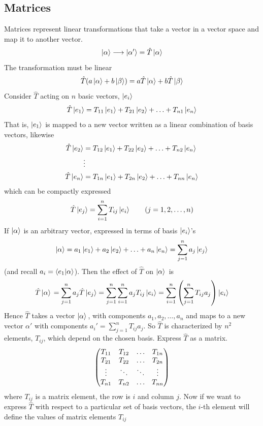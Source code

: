\documentclass[english, 11pt]{article}
\begin{document}
     \subsection{Matrices}

        Matrices represent linear transformations that take a vector in a vector space and map it to another vector.
        \[ \left|\alpha\right\rangle \longrightarrow \left|\alpha'\right\rangle= \hat{T} \left|\alpha\right\rangle \]
        The transformation must be linear
        \[ \hat{T}(a \left|\alpha\right\rangle + b \left|\beta\right\rangle) = a\hat{T}\left|\alpha\right\rangle + b \hat{T}\left|\beta\right\rangle \]
        Consider $\hat{T}$ acting on $n$ basic vectors, $\left|e_i\right\rangle$
        \[ \hat{T} \left|e_1\right\rangle = T_{11}\left|e_1\right\rangle + T_{21}\left|e_2\right\rangle + \ldots + T_{n1} \left|e_n\right\rangle \]
        That is, $\left|e_1\right\rangle$ is mapped to a new vector written as a linear combination of basis vectors, likewise
        \begin{align*}
          \hat{T} \left|e_2\right\rangle & = T_{12}\left|e_1\right\rangle + T_{22}\left|e_2\right\rangle + \ldots + T_{n2} \left|e_n\right\rangle \\
          & \vdots \\
          \hat{T} \left|e_n\right\rangle & = T_{1n} \left|e_1\right\rangle + T_{2n} \left|e_2\right\rangle + \ldots + T_{nn} \left|e_n\right\rangle
        \end{align*}
        which can be compactly expressed
        \[ \hat{T}\ket{e_j} = \sum_{i=1}^nT_{ij} \ket{e_i} \ \ \ \ \ \ (j = 1,2,\ldots,n) \]
        If $\left|\alpha\right\rangle$ is an arbitrary vector, expressed in terms of basis $\left|e_i\right\rangle$'s
        \[ \left|\alpha\right\rangle = a_1\left|e_1\right\rangle + a_2\left|e_2\right\rangle + \ldots + a_n\left|e_n\right\rangle = \sum_{j=1}^n a_j\left|e_j\right\rangle \]
        (and recall $a_i = \braket{e_1}{\alpha}$). Then the effect of $\hat{T}$ on $\left| \alpha \rangle \right.$ is
        \[ \hat{T}\left| \alpha \rangle \right. = \sum_{j=1}^n a_j \hat{T} \left|e_j\right\rangle = \sum_{j=1}^n \sum_{i=1}^n a_j T_{ij} \left|e_i\right\rangle = \sum_{i=1}^n \left( \sum_{j=1}^n T_{ij}a_j \right) \left|e_i\right\rangle \]
        Hence $\hat{T}$ takes a vector $\left| \alpha \rangle \right.$, with components $a_1, a_2, \ldots, a_n$ and maps to a new vector $\alpha'$ with components $a_i' = \sum_{j=1}^n T_{ij} a_j$. So $\hat{T}$ is characterized by $n^2$ elements, $T_{ij}$, which depend on the chosen basis. Express $\hat{T}$ as a matrix.
        \[ \left(\begin{matrix}T_{11} & T_{12} & \hdots & T_{1n} \\ T_{21} & T_{22} & \hdots & T_{2n} \\ \vdots & \ddots & \ddots & \vdots \\ T_{n1} & T_{n2} & \hdots & T_{nn} \end{matrix}\right) \]
        where $T_{ij}$ is a matrix element, the row is $i$ and column $j$. Now if we want to express $\hat{T}$ with respect to a particular set of basis vectors, the $i$-th element will define the values of matrix elements $T_{ij}$
\end{document}
